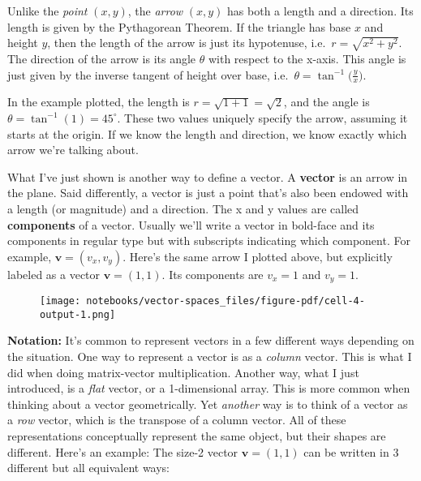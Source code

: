 \documentclass[
  letterpaper,
  DIV=11,
  numbers=noendperiod]{scrreprt}
\newenvironment{Shaded}{\begin{snugshade}}{\end{snugshade}}
\newcommand{\DecValTok}[1]{\textcolor[rgb]{0.68,0.00,0.00}{#1}}
\newcommand{\FloatTok}[1]{\textcolor[rgb]{0.68,0.00,0.00}{#1}}
\newcommand{\NormalTok}[1]{\textcolor[rgb]{0.00,0.23,0.31}{#1}}
\newcommand{\OperatorTok}[1]{\textcolor[rgb]{0.37,0.37,0.37}{#1}}
\newcommand{\SpecialCharTok}[1]{\textcolor[rgb]{0.37,0.37,0.37}{#1}}
\newcommand{\StringTok}[1]{\textcolor[rgb]{0.13,0.47,0.30}{#1}}
\begin{document}
Unlike the \emph{point} \((x,y)\), the \emph{arrow} \((x,y)\) has both a
length and a direction. Its length is given by the Pythagorean Theorem.
If the triangle has base \(x\) and height \(y\), then the length of the
arrow is just its hypotenuse, i.e.~\(r = \sqrt{x^2 + y^2}\). The
direction of the arrow is its angle \(\theta\) with respect to the
x-axis. This angle is just given by the inverse tangent of height over
base, i.e.~\(\theta = \tan^{-1}\big(\frac{y}{x}\big)\).

In the example plotted, the length is \(r=\sqrt{1+1}=\sqrt{2}\), and the
angle is \(\theta = \tan^{-1}(1) = 45^\circ\). These two values uniquely
specify the arrow, assuming it starts at the origin. If we know the
length and direction, we know exactly which arrow we're talking about.

What I've just shown is another way to define a vector. A
\textbf{vector} is an arrow in the plane. Said differently, a vector is
just a point that's also been endowed with a length (or magnitude) and a
direction. The x and y values are called \textbf{components} of a
vector. Usually we'll write a vector in bold-face and its components in
regular type but with subscripts indicating which component. For
example, \(\mathbf{v}=(v_x,v_y)\). Here's the same arrow I plotted
above, but explicitly labeled as a vector \(\mathbf{v}=(1,1)\). Its
components are \(v_x=1\) and \(v_y=1\).

\begin{Shaded}
\end{Shaded}

\begin{figure}[H]

{\centering \texttt{[image: notebooks/vector-spaces\_files/figure-pdf/cell-4-output-1.png]}

}

\end{figure}

\textbf{Notation:} It's common to represent vectors in a few different
ways depending on the situation. One way to represent a vector is as a
\emph{column} vector. This is what I did when doing matrix-vector
multiplication. Another way, what I just introduced, is a \emph{flat}
vector, or a 1-dimensional array. This is more common when thinking
about a vector geometrically. Yet \emph{another} way is to think of a
vector as a \emph{row} vector, which is the transpose of a column
vector. All of these representations conceptually represent the same
object, but their shapes are different. Here's an example: The size-2
vector \(\mathbf{v}=(1,1)\) can be written in 3 different but all
equivalent ways:
\end{document}

